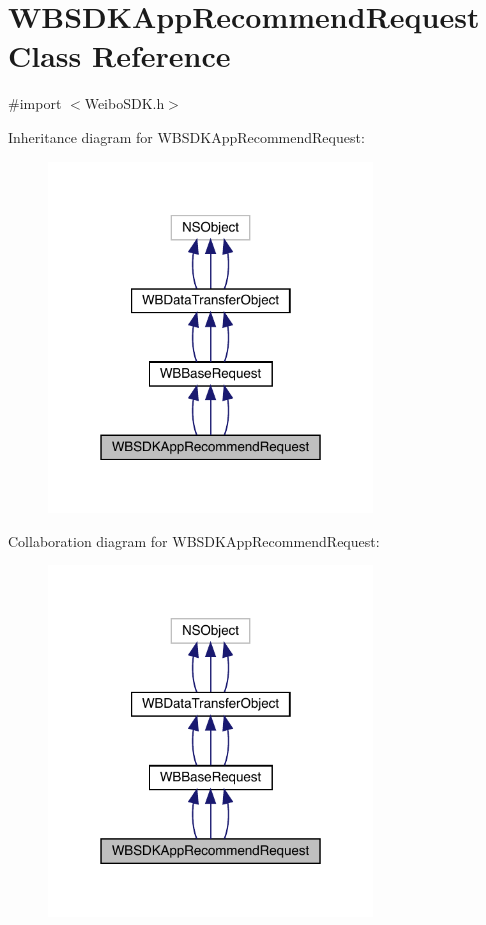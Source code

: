 \hypertarget{interface_w_b_s_d_k_app_recommend_request}{}\section{W\+B\+S\+D\+K\+App\+Recommend\+Request Class Reference}
\label{interface_w_b_s_d_k_app_recommend_request}


{\ttfamily \#import $<$Weibo\+S\+D\+K.\+h$>$}



Inheritance diagram for W\+B\+S\+D\+K\+App\+Recommend\+Request\+:\nopagebreak
\begin{figure}[H]
\begin{center}
\leavevmode
\includegraphics[width=244pt]{interface_w_b_s_d_k_app_recommend_request__inherit__graph}
\end{center}
\end{figure}


Collaboration diagram for W\+B\+S\+D\+K\+App\+Recommend\+Request\+:\nopagebreak
\begin{figure}[H]
\begin{center}
\leavevmode
\includegraphics[width=244pt]{interface_w_b_s_d_k_app_recommend_request__coll__graph}
\end{center}
\end{figure}
